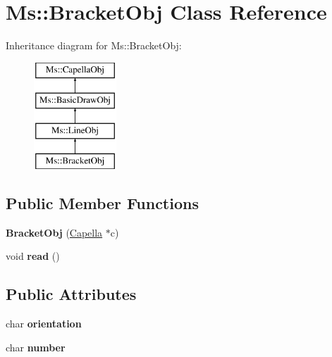 \hypertarget{class_ms_1_1_bracket_obj}{}\section{Ms\+:\+:Bracket\+Obj Class Reference}
\label{class_ms_1_1_bracket_obj}
Inheritance diagram for Ms\+:\+:Bracket\+Obj\+:\begin{figure}[H]
\begin{center}
\leavevmode
\includegraphics[height=4.000000cm]{class_ms_1_1_bracket_obj}
\end{center}
\end{figure}
\subsection*{Public Member Functions}
\begin{DoxyCompactItemize}
\item 
\mbox{\label{class_ms_1_1_bracket_obj_a971cbc7a091bd82674dc31dd09f939b7}} 
{\bfseries Bracket\+Obj} (\hyperlink{class_ms_1_1_capella}{Capella} $\ast$c)
\item 
\mbox{\label{class_ms_1_1_bracket_obj_a2eca163df2b39c9ff453e8d750603fc9}} 
void {\bfseries read} ()
\end{DoxyCompactItemize}
\subsection*{Public Attributes}
\begin{DoxyCompactItemize}
\item 
\mbox{\label{class_ms_1_1_bracket_obj_aac18447649210bc295abbc286c504e40}} 
char {\bfseries orientation}
\item 
\mbox{\label{class_ms_1_1_bracket_obj_a9cb7558a753c04dbf1c6f6305d7d2c0f}} 
char {\bfseries number}
\end{DoxyCompactItemize}
